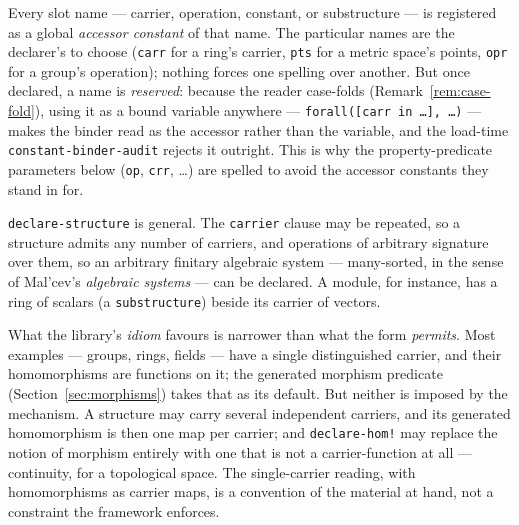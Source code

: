 Every slot name --- carrier, operation, constant, or substructure --- is
registered as a global \emph{accessor constant} of that name.  The
particular names are the declarer's to choose (\texttt{carr} for a ring's
carrier, \texttt{pts} for a metric space's points, \texttt{opr} for a
group's operation); nothing forces one spelling over another.  But once
declared, a name is \emph{reserved}: because the reader case-folds
(Remark~\ref{rem:case-fold}), using it as a bound variable anywhere ---
\texttt{forall([carr in \ldots], \ldots)} --- makes the binder read as the
accessor rather than the variable, and the load-time
\texttt{constant-binder-audit} rejects it outright.  This is why the
property-predicate parameters below (\texttt{op}, \texttt{crr}, \ldots)
are spelled to avoid the accessor constants they stand in for.

\begin{remark}
\texttt{declare-structure} is general.  The \texttt{carrier} clause may be
repeated, so a structure admits any number of carriers, and operations of arbitrary signature over them,
so an arbitrary finitary algebraic system --- many-sorted, in the sense of
Mal'cev's \emph{algebraic systems} --- can be declared.  A module, for instance,
has a ring of scalars (a \texttt{substructure}) beside its carrier of vectors.

What the library's \emph{idiom} favours is narrower than what the form
\emph{permits}.  Most examples --- groups, rings, fields --- have a single
distinguished carrier, and their homomorphisms are functions on it; the generated
morphism predicate (Section~\ref{sec:morphisms}) takes that as its default.  But
neither is imposed by the mechanism.  A structure may carry several independent
carriers, and its generated homomorphism is then one map per carrier; and
\texttt{declare-hom!} may replace the notion of morphism entirely with one that is
not a carrier-function at all --- continuity, for a topological space.  The
single-carrier reading, with homomorphisms as carrier maps, is a convention of the
material at hand, not a constraint the framework enforces.
\end{remark}


